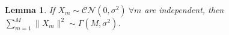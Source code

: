\documentclass[journal,12pt,onecolumn]{IEEEtran}
\newtheorem{lemma}{Lemma}
\begin{document}

\begin{lemma} If $X_{m} \sim \mathcal{CN}(0,\sigma^2) \ \forall m$ are independent, then $\sum_{m=1}^{M}{\lVert X_{m} \rVert^{2}} \sim \Gamma(M,\sigma^2)$.
\end{lemma}


\end{document}
